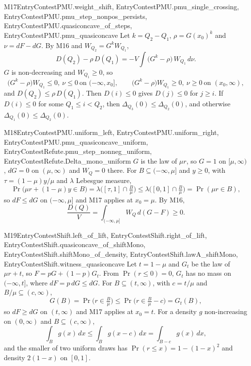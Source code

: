 \begin{mproof}{M17}{EntryContestPMU.weight_shift, EntryContestPMU.pmu_single_crossing, EntryContestPMU.pmu_step_nonpos_persists, EntryContestPMU.quasiconcave_of_steps, EntryContestPMU.pmu_quasiconcave}
Let $k=Q_2-Q_1$, $\rho=G(x_0)^k$ and $\nu=dF-dG$. By M16 and $W_{Q_2}=G^kW_{Q_1}$,
\[
  D(Q_2)-\rho\,D(Q_1)=-V\int\big(G^k-\rho\big)\,W_{Q_1}\,d\nu .
\]
$G$ is non-decreasing and $W_{Q_1}\ge0$, so
\[
  \big(G^k-\rho\big)W_{Q_1}\le0,\ \nu\le0\ \text{on }(-\infty,x_0],\qquad
  \big(G^k-\rho\big)W_{Q_1}\ge0,\ \nu\ge0\ \text{on }(x_0,\infty),
\]
and $D(Q_2)\le\rho\,D(Q_1)$. Then $D(i)\le0$ gives $D(j)\le0$ for $j\ge i$. If
$D(i)\le0$ for some $Q_1\le i<Q_2$, then $\Delta_{Q_3}(0)\le\Delta_{Q_2}(0)$, and
otherwise $\Delta_{Q_1}(0)\le\Delta_{Q_2}(0)$.
\end{mproof}

\begin{mproof}{M18}{EntryContestPMU.uniform_left, EntryContestPMU.uniform_right, EntryContestPMU.pmu_quasiconcave_uniform, EntryContestRefute.pmu_step_nonneg_uniform, EntryContestRefute.Delta_mono_uniform}
$G$ is the law of $\mu r$, so $G=1$ on $[\mu,\infty)$, $dG=0$ on $(\mu,\infty)$
and $W_Q=0$ there. For $B\subseteq(-\infty,\mu]$ and $y\ge0$, with
$\tau=(1-\mu)y/\mu$ and $\lambda$ Lebesgue measure,
\[
  \Pr\big(\mu r+(1-\mu)y\in B\big)=\lambda\Big([\tau,1]\cap\tfrac B\mu\Big)
  \le\lambda\Big([0,1]\cap\tfrac B\mu\Big)=\Pr(\mu r\in B),
\]
so $dF\le dG$ on $(-\infty,\mu]$ and M17 applies at $x_0=\mu$. By M16,
\[
  \frac{D(Q)}V=\int_{(-\infty,\mu]}W_Q\,d(G-F)\ge0 .
\]
\end{mproof}

\begin{mproof}{M19}{EntryContestShift.left_of_lift, EntryContestShift.right_of_lift, EntryContestShift.quasiconcave_of_shiftMono, EntryContestShift.shiftMono_of_density, EntryContestShift.lawA_shiftMono, EntryContestShift.witness_quasiconcave}
Let $t=1-\mu$ and $G_t$ be the law of $\mu r+t$, so $F=pG+(1-p)G_t$. From
$\Pr(r\le0)=0$, $G_t$ has no mass on $(-\infty,t]$, where $dF=p\,dG\le dG$. For
$B\subseteq(t,\infty)$, with $c=t/\mu$ and $B/\mu\subseteq(c,\infty)$,
\[
  G(B)=\Pr\big(r\in\tfrac B\mu\big)\le\Pr\big(r\in\tfrac B\mu-c\big)=G_t(B),
\]
so $dF\ge dG$ on $(t,\infty)$ and M17 applies at $x_0=t$. For a density $g$
non-increasing on $(0,\infty)$ and $B\subseteq(c,\infty)$,
\[
  \int_B g(x)\,dx\le\int_B g(x-c)\,dx=\int_{B-c}g(x)\,dx ,
\]
and the smaller of two uniform draws has $\Pr(r\le x)=1-(1-x)^2$ and density
$2(1-x)$ on $[0,1]$.
\end{mproof}

